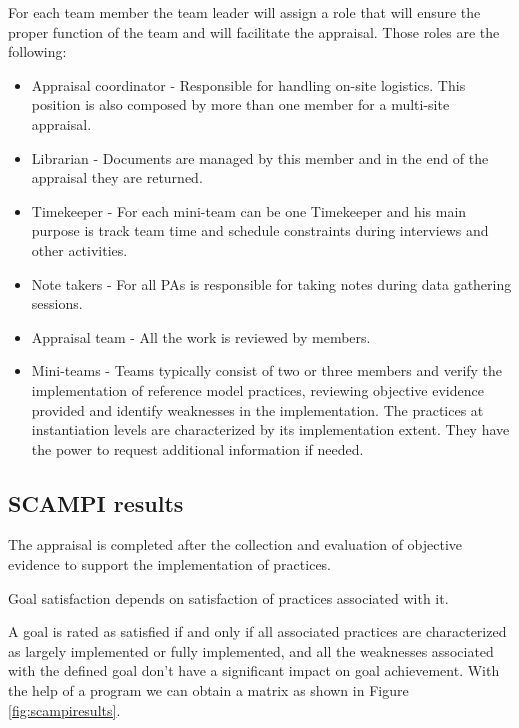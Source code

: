 For each team member the team leader will assign a role that will ensure the proper function of the team and will facilitate the appraisal. Those roles are the following:
\begin{itemize}
	\item Appraisal coordinator - Responsible for handling on-site logistics. This position is also composed by more than one member for a multi-site appraisal.
	\item Librarian - Documents are managed by this member and in the end of the appraisal they are returned.
	\item Timekeeper - For each mini-team can be one Timekeeper and his main purpose is track team time and schedule constraints during interviews and other activities.
	\item Note takers - For all PAs is responsible for taking notes during data gathering sessions.
	\item Appraisal team - All the work is reviewed by members.
	\item Mini-teams - Teams typically consist of two or three members and verify the implementation of reference model practices, reviewing objective evidence provided and identify weaknesses in the implementation. The practices at instantiation levels are characterized by its implementation extent. They have the power to request additional information if needed. 
\end{itemize}

\subsection{SCAMPI results}

The appraisal is completed after the collection and evaluation of objective evidence to support the implementation of practices.

Goal satisfaction depends on satisfaction of practices associated with it.

A goal is rated as satisfied if and only if all associated practices are characterized as largely implemented or fully implemented, and all the weaknesses associated with the defined goal don't have a significant impact on goal achievement.
With the help of a program we can obtain a matrix as shown in Figure \ref{fig:scampiresults}.

% 


